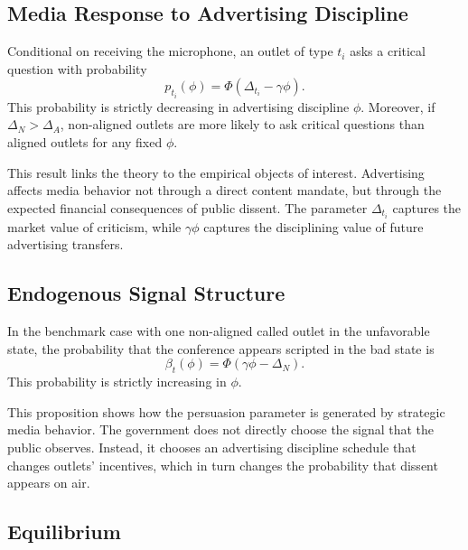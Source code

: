 \subsection{Media Response to Advertising Discipline}

\begin{proposition}
Conditional on receiving the microphone, an outlet of type $t_i$ asks a critical question with probability
\begin{equation}
    p_{t_i}(\phi)=\Phi(\Delta_{t_i}-\gamma\phi).
\end{equation}
This probability is strictly decreasing in advertising discipline $\phi$. Moreover, if $\Delta_N>\Delta_A$, non-aligned outlets are more likely to ask critical questions than aligned outlets for any fixed $\phi$.
\end{proposition}

This result links the theory to the empirical objects of interest. Advertising affects media behavior not through a direct content mandate, but through the expected financial consequences of public dissent. The parameter $\Delta_{t_i}$ captures the market value of criticism, while $\gamma\phi$ captures the disciplining value of future advertising transfers.

\subsection{Endogenous Signal Structure}

\begin{proposition}
In the benchmark case with one non-aligned called outlet in the unfavorable state, the probability that the conference appears scripted in the bad state is
\begin{equation}
    \beta_t(\phi)=\Phi(\gamma\phi-\Delta_N).
\end{equation}
This probability is strictly increasing in $\phi$.
\end{proposition}

This proposition shows how the persuasion parameter is generated by strategic media behavior. The government does not directly choose the signal that the public observes. Instead, it chooses an advertising discipline schedule that changes outlets' incentives, which in turn changes the probability that dissent appears on air.

\subsection{Equilibrium}

